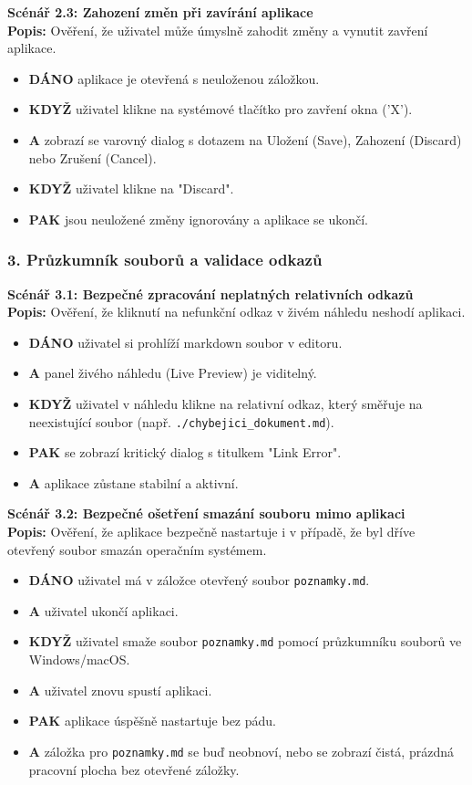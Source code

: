 \documentclass[12pt, a4paper]{article}
\begin{document}
\textbf{Scénář 2.3: Zahození změn při zavírání aplikace} \\
\textbf{Popis:} Ověření, že uživatel může úmyslně zahodit změny a vynutit zavření aplikace.
\begin{itemize}
    \item \textbf{DÁNO} aplikace je otevřená s neuloženou záložkou.
    \item \textbf{KDYŽ} uživatel klikne na systémové tlačítko pro zavření okna ('X').
    \item \textbf{A} zobrazí se varovný dialog s dotazem na Uložení (Save), Zahození (Discard) nebo Zrušení (Cancel).
    \item \textbf{KDYŽ} uživatel klikne na "Discard".
    \item \textbf{PAK} jsou neuložené změny ignorovány a aplikace se ukončí.
\end{itemize}

\subsubsection*{3. Průzkumník souborů a validace odkazů}

\textbf{Scénář 3.1: Bezpečné zpracování neplatných relativních odkazů} \\
\textbf{Popis:} Ověření, že kliknutí na nefunkční odkaz v živém náhledu neshodí aplikaci.
\begin{itemize}
    \item \textbf{DÁNO} uživatel si prohlíží markdown soubor v editoru.
    \item \textbf{A} panel živého náhledu (Live Preview) je viditelný.
    \item \textbf{KDYŽ} uživatel v náhledu klikne na relativní odkaz, který směřuje na neexistující soubor (např. \texttt{./chybejici\_dokument.md}).
    \item \textbf{PAK} se zobrazí kritický dialog s titulkem "Link Error".
    \item \textbf{A} aplikace zůstane stabilní a aktivní.
\end{itemize}

\textbf{Scénář 3.2: Bezpečné ošetření smazání souboru mimo aplikaci} \\
\textbf{Popis:} Ověření, že aplikace bezpečně nastartuje i v případě, že byl dříve otevřený soubor smazán operačním systémem.
\begin{itemize}
    \item \textbf{DÁNO} uživatel má v záložce otevřený soubor \texttt{poznamky.md}.
    \item \textbf{A} uživatel ukončí aplikaci.
    \item \textbf{KDYŽ} uživatel smaže soubor \texttt{poznamky.md} pomocí průzkumníku souborů ve Windows/macOS.
    \item \textbf{A} uživatel znovu spustí aplikaci.
    \item \textbf{PAK} aplikace úspěšně nastartuje bez pádu.
    \item \textbf{A} záložka pro \texttt{poznamky.md} se buď neobnoví, nebo se zobrazí čistá, prázdná pracovní plocha bez otevřené záložky.
\end{itemize}
\end{document}
